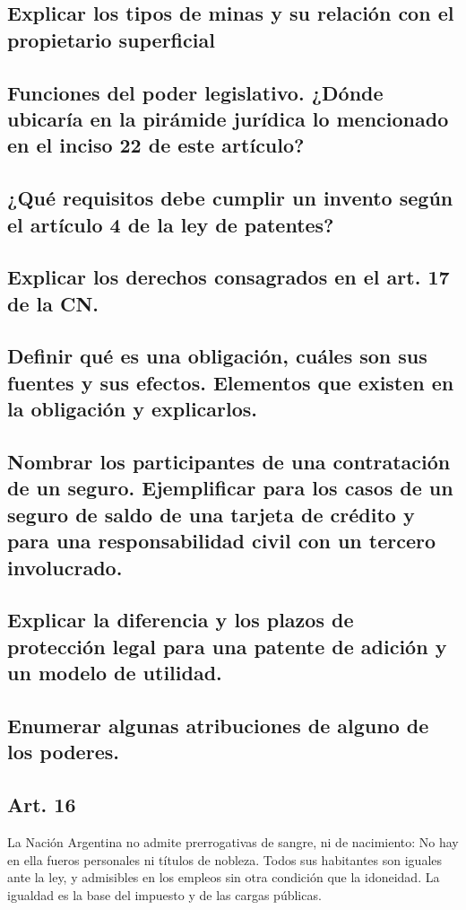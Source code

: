 \documentclass{article}
\begin{document}
\subsection{Explicar los tipos de minas y su relación con el propietario superficial}

\subsection{Funciones del poder legislativo. ¿Dónde ubicaría en la pirámide jurídica lo mencionado en el inciso 22 de este artículo?}

\subsection{¿Qué requisitos debe cumplir un invento según el artículo 4 de la ley de patentes?}

\subsection{Explicar los derechos consagrados en el art. 17 de la CN.}

\subsection{Definir qué es una obligación, cuáles son sus fuentes y sus efectos. Elementos que existen en la obligación y explicarlos.}

\subsection{Nombrar los participantes de una contratación de un seguro. Ejemplificar para los casos de un seguro de saldo de una tarjeta de crédito y para una responsabilidad civil con un tercero involucrado.}

\subsection{Explicar la diferencia y los plazos de protección legal para una patente de adición y un modelo de utilidad.}

\subsection{Enumerar algunas atribuciones de alguno de los poderes.}

\subsection{Art. 16}
La Nación Argentina no admite prerrogativas de sangre, ni de nacimiento: No hay en ella fueros personales ni títulos de nobleza. Todos sus habitantes son iguales ante la ley, y admisibles en los empleos sin otra condición que la idoneidad. La igualdad es la base del impuesto y de las cargas públicas.
\end{document}
